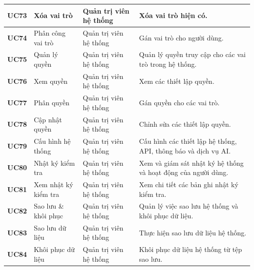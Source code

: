 \begin{longtable}{|p{1.2cm}|p{3.5cm}|p{2.8cm}|p{6.5cm}|}
\textbf{UC73} & Xóa vai trò & Quản trị viên hệ thống &
Xóa vai trò hiện có. \\
\hline

\textbf{UC74} & Phân công vai trò & Quản trị viên hệ thống &
Gán vai trò cho người dùng. \\
\hline

\textbf{UC75} & Quản lý quyền & Quản trị viên hệ thống &
Quản lý quyền truy cập cho các vai trò trong hệ thống. \\
\hline

\textbf{UC76} & Xem quyền & Quản trị viên hệ thống &
Xem các thiết lập quyền. \\
\hline

\textbf{UC77} & Phân quyền & Quản trị viên hệ thống &
Gán quyền cho các vai trò. \\
\hline

\textbf{UC78} & Cập nhật quyền & Quản trị viên hệ thống &
Chỉnh sửa các thiết lập quyền. \\
\hline

\textbf{UC79} & Cấu hình hệ thống & Quản trị viên hệ thống &
Cấu hình các thiết lập hệ thống, API, thông báo và dịch vụ AI. \\
\hline

\textbf{UC80} & Nhật ký kiểm tra & Quản trị viên hệ thống &
Xem và giám sát nhật ký hệ thống và hoạt động của người dùng. \\
\hline

\textbf{UC81} & Xem nhật ký kiểm tra & Quản trị viên hệ thống &
Xem chi tiết các bản ghi nhật ký kiểm tra. \\
\hline

\textbf{UC82} & Sao lưu \& khôi phục & Quản trị viên hệ thống &
Quản lý việc sao lưu hệ thống và khôi phục dữ liệu. \\
\hline

\textbf{UC83} & Sao lưu dữ liệu & Quản trị viên hệ thống &
Thực hiện sao lưu dữ liệu hệ thống. \\
\hline

\textbf{UC84} & Khôi phục dữ liệu & Quản trị viên hệ thống &
Khôi phục dữ liệu hệ thống từ tệp sao lưu. \\
\hline

\end{longtable}
